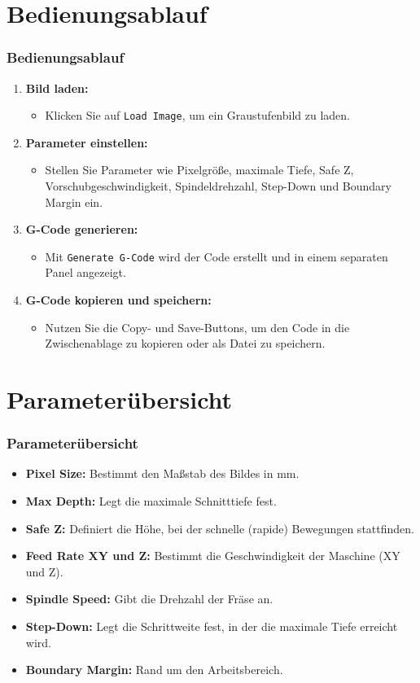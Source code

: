 \documentclass[14pt, aspectratio=169]{beamer}
\begin{document}
\section{Bedienungsablauf}
\begin{frame}
  \frametitle{Bedienungsablauf}
  \begin{enumerate}
    \item \textbf{Bild laden:} 
      \begin{itemize}
        \item Klicken Sie auf \texttt{Load Image}, um ein Graustufenbild zu laden.
      \end{itemize}

    \item \textbf{Parameter einstellen:}
      \begin{itemize}
        \item Stellen Sie Parameter wie Pixelgröße, maximale Tiefe, Safe Z, Vorschubgeschwindigkeit, Spindeldrehzahl, Step-Down und Boundary Margin ein.
      \end{itemize}
    \item \textbf{G-Code generieren:}
      \begin{itemize}
        \item Mit \texttt{Generate G-Code} wird der Code erstellt und in einem separaten Panel angezeigt.
      \end{itemize}
    \item \textbf{G-Code kopieren und speichern:}
      \begin{itemize}
        \item Nutzen Sie die Copy- und Save-Buttons, um den Code in die Zwischenablage zu kopieren oder als Datei zu speichern.
      \end{itemize}
  \end{enumerate}
\end{frame}

\section{Parameterübersicht}
\begin{frame}
  \frametitle{Parameterübersicht}
  \begin{itemize}
    \item \textbf{Pixel Size:} Bestimmt den Maßstab des Bildes in mm.
    \item \textbf{Max Depth:} Legt die maximale Schnitttiefe fest.
    \item \textbf{Safe Z:} Definiert die Höhe, bei der schnelle (rapide) Bewegungen stattfinden.
    \item \textbf{Feed Rate XY und Z:} Bestimmt die Geschwindigkeit der Maschine (XY und Z).
    \item \textbf{Spindle Speed:} Gibt die Drehzahl der Fräse an.
    \item \textbf{Step-Down:} Legt die Schrittweite fest, in der die maximale Tiefe erreicht wird.
    \item \textbf{Boundary Margin:} Rand um den Arbeitsbereich.
  \end{itemize}
\end{frame}
\end{document}
